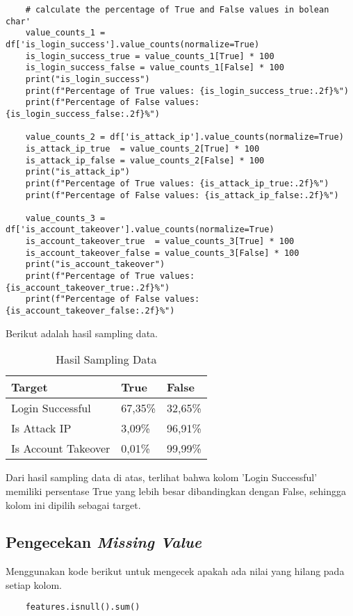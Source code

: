 \begin{lstlisting}
    # calculate the percentage of True and False values in bolean char'
    value_counts_1 = df['is_login_success'].value_counts(normalize=True)
    is_login_success_true = value_counts_1[True] * 100
    is_login_success_false = value_counts_1[False] * 100
    print("is_login_success")
    print(f"Percentage of True values: {is_login_success_true:.2f}%")
    print(f"Percentage of False values: {is_login_success_false:.2f}%")

    value_counts_2 = df['is_attack_ip'].value_counts(normalize=True)
    is_attack_ip_true  = value_counts_2[True] * 100
    is_attack_ip_false = value_counts_2[False] * 100
    print("is_attack_ip")
    print(f"Percentage of True values: {is_attack_ip_true:.2f}%")
    print(f"Percentage of False values: {is_attack_ip_false:.2f}%")

    value_counts_3 = df['is_account_takeover'].value_counts(normalize=True)
    is_account_takeover_true  = value_counts_3[True] * 100
    is_account_takeover_false = value_counts_3[False] * 100
    print("is_account_takeover")
    print(f"Percentage of True values: {is_account_takeover_true:.2f}%")
    print(f"Percentage of False values: {is_account_takeover_false:.2f}%")
    \end{lstlisting}

    Berikut adalah hasil sampling data.

    \begin{table}[H]
        \centering
        \begin{tabular}{|l|l|l|}
        \hline
        \textbf{Target} & \textbf{True} & \textbf{False} \\ \hline
        Login Successful & 67,35\% & 32,65\% \\ \hline
        Is Attack IP & 3,09\% & 96,91\% \\ \hline
        Is Account Takeover & 0,01\% & 99,99\% \\ \hline
        \end{tabular}
        \caption{Hasil Sampling Data}
        \label{tab:sampling_data}
        \end{table}

        Dari hasil sampling data di atas, terlihat bahwa kolom 'Login Successful' memiliki persentase True yang lebih besar dibandingkan dengan False, sehingga kolom ini dipilih sebagai target.


\subsection{Pengecekan \textit{Missing Value}}
Menggunakan kode berikut untuk mengecek apakah ada nilai yang hilang pada setiap kolom.
\begin{lstlisting}
    features.isnull().sum()
    \end{lstlisting}

